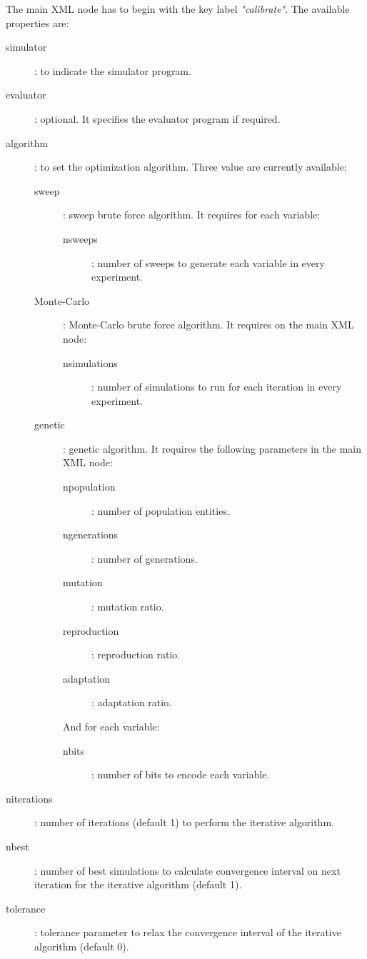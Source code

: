 \documentclass[review,authoryear]{elsarticle}
\begin{document}
The main XML node has to begin with the key label \emph{"calibrate"}. The
available properties are:
\begin{description}
	\item[simulator]: to indicate the simulator program.
	\item[evaluator]: optional. It specifies the evaluator program if required.
	\item[algorithm]: to set the optimization algorithm. Three value are currently available:
	\begin{description}
		\item[sweep]: sweep brute force algorithm. It requires for each variable:
		\begin{description}
			\item[nsweeps]: number of sweeps to generate each variable in every
			experiment.
		\end{description}
	\item[Monte-Carlo]: Monte-Carlo brute force algorithm. It requires on the main
		XML node:
		\begin{description}
			\item[nsimulations]: number of simulations to run for each iteration in
			every experiment.
		\end{description}
	\item[genetic]: genetic algorithm. It requires the following parameters in the
		main XML node:
		\begin{description}
			\item[npopulation]: number of population entities.
			\item[ngenerations]: number of generations.
			\item[mutation]: mutation ratio.
			\item[reproduction]: reproduction ratio.
			\item[adaptation]: adaptation ratio.
		\end{description}
	And for each variable:
		\begin{description}
			\item[nbits]: number of bits to encode each variable.
		\end{description}
	\end{description}
\item[niterations]: number of iterations (default 1) to perform the iterative
algorithm.
\item[nbest]: number of best simulations to calculate convergence interval on
next iteration for the iterative algorithm (default 1).
\item[tolerance]: tolerance parameter to relax the convergence interval of the
iterative algorithm (default 0).
\end{description}
\end{document}
